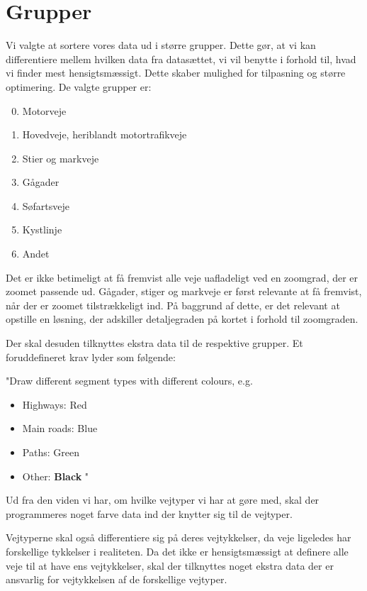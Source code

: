 \section{Grupper}
Vi valgte at sortere vores data ud i større grupper. Dette gør, at vi kan differentiere mellem hvilken data fra datasættet, vi vil benytte i forhold til, hvad vi finder mest hensigtsmæssigt. Dette skaber mulighed for tilpasning og større optimering. De valgte grupper er:
\begin{enumerate}
\setcounter{enumi}{-1}
	\item Motorveje
	\item Hovedveje, heriblandt motortrafikveje
	\item Stier og markveje
	\item Gågader
	\item Søfartsveje
	\item Kystlinje
	\item Andet
\end{enumerate}

Det er ikke betimeligt at få fremvist alle veje uafladeligt ved en zoomgrad, der er zoomet passende ud. Gågader, stiger og markveje er først relevante at få fremvist, når der er zoomet tilstrækkeligt ind. På baggrund af dette, er det relevant at opstille en løsning, der adskiller detaljegraden på kortet i forhold til zoomgraden.

Der skal desuden tilknyttes ekstra data til de respektive grupper. Et foruddefineret krav lyder som følgende: 

"Draw different segment types with different colours, e.g.

\begin{itemize}
	\item Highways: {\color{red} Red}
	\item Main roads: {\color{blue} Blue}
	\item Paths: {\color{green} Green}
	\item Other: \textbf{Black} " 
\end{itemize}

Ud fra den viden vi har, om hvilke vejtyper vi har at gøre med, skal der programmeres noget farve data ind der knytter sig til de vejtyper. 

Vejtyperne skal også differentiere sig på deres vejtykkelser, da veje ligeledes har forskellige tykkelser i realiteten. Da det ikke er hensigtsmæssigt at definere alle veje til at have ens vejtykkelser, skal der tilknyttes noget ekstra data der er ansvarlig for vejtykkelsen af de forskellige vejtyper.  

